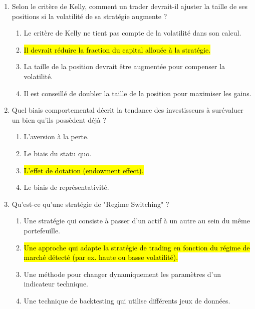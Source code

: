 \documentclass[a4paper,12pt]{article}
\begin{document}
\begin{enumerate}
    \item Selon le critère de Kelly, comment un trader devrait-il ajuster la taille de ses positions si la volatilité de sa stratégie augmente ?
    \begin{enumerate}[label=(\Alph*)]
        \item Le critère de Kelly ne tient pas compte de la volatilité dans son calcul.
        \item \hl{Il devrait réduire la fraction du capital allouée à la stratégie.}
        \item La taille de la position devrait être augmentée pour compenser la volatilité.
        \item Il est conseillé de doubler la taille de la position pour maximiser les gains.
    \end{enumerate}

    \item Quel biais comportemental décrit la tendance des investisseurs à surévaluer un bien qu'ils possèdent déjà ?
    \begin{enumerate}[label=(\Alph*)]
        \item L'aversion à la perte.
        \item Le biais du statu quo.
        \item \hl{L'effet de dotation (endowment effect).}
        \item Le biais de représentativité.
    \end{enumerate}

    \item Qu'est-ce qu'une stratégie de "Regime Switching" ?
    \begin{enumerate}[label=(\Alph*)]
        \item Une stratégie qui consiste à passer d'un actif à un autre au sein du même portefeuille.
        \item \hl{Une approche qui adapte la stratégie de trading en fonction du régime de marché détecté (par ex. haute ou basse volatilité).}
        \item Une méthode pour changer dynamiquement les paramètres d'un indicateur technique.
        \item Une technique de backtesting qui utilise différents jeux de données.
    \end{enumerate}
    

\end{enumerate}
\end{document}
